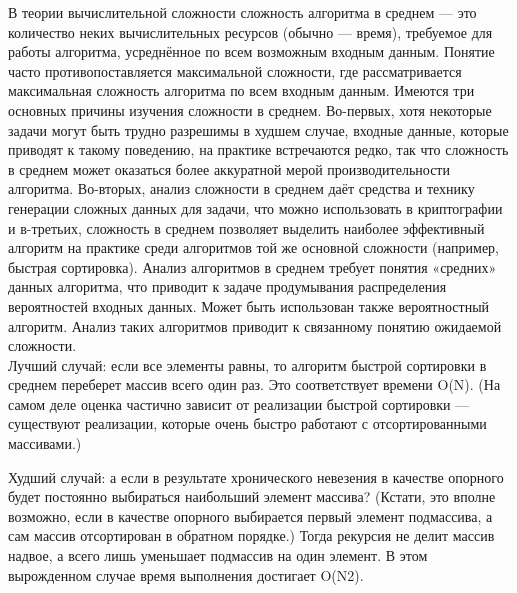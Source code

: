 \documentclass[12pt, a4paper]{article}
\begin{document}
\begin{figure}[h]
\end{figure}

В теории вычислительной сложности сложность алгоритма в среднем — это количество неких вычислительных ресурсов (обычно — время), требуемое для работы алгоритма, усреднённое по всем возможным входным данным. Понятие часто противопоставляется максимальной сложности, где рассматривается максимальная сложность алгоритма по всем входным данным. Имеются три основных причины изучения сложности в среднем. Во-первых, хотя некоторые задачи могут быть трудно разрешимы в худшем случае, входные данные, которые приводят к такому поведению, на практике встречаются редко, так что сложность в среднем может оказаться более аккуратной мерой производительности алгоритма. Во-вторых, анализ сложности в среднем даёт средства и технику генерации сложных данных для задачи, что можно использовать в криптографии и в-третьих, сложность в среднем позволяет выделить наиболее эффективный алгоритм на практике среди алгоритмов той же основной сложности (например, быстрая сортировка). Анализ алгоритмов в среднем требует понятия «средних» данных алгоритма, что приводит к задаче продумывания распределения вероятностей входных данных. Может быть использован также вероятностный алгоритм. Анализ таких алгоритмов приводит к связанному понятию ожидаемой сложности.\\

Лучший случай: если все элементы равны, то алгоритм быстрой сортировки
в среднем переберет массив всего один раз. Это соответствует времени O(N).
(На самом деле оценка частично зависит от реализации быстрой сортировки —
существуют реализации, которые очень быстро работают с отсортированными
массивами.)

Худший случай: а если в результате хронического невезения в качестве опорного
будет постоянно выбираться наибольший элемент массива? (Кстати, это вполне
возможно, если в качестве опорного выбирается первый элемент подмассива,
а сам массив отсортирован в обратном порядке.) Тогда рекурсия не делит массив
надвое, а всего лишь уменьшает подмассив на один элемент. В этом вырожденном
случае время выполнения достигает O(N2).
\end{document}

